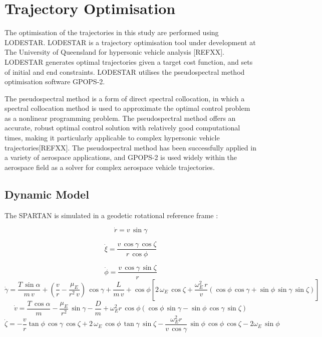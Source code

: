 \documentclass[conf]{new-aiaa}
\begin{document}
\section{Trajectory Optimisation}\label{sec:opt}
The optimisation of the trajectories in this study are performed using LODESTAR. LODESTAR is a trajectory optimisation tool under development at The University of Queensland for hypersonic vehicle analysis [REFXX]. LODESTAR generates optimal trajectories given a target cost function, and sets of initial and end constraints. LODESTAR utilises the pseudospectral method optimisation software GPOPS-2\cite{Patterson2015}. 

The pseudospectral method is a form of direct spectral collocation, in which a spectral collocation method is used to approximate the optimal control problem as a nonlinear programming problem. The pseudospectral method offers an accurate, robust optimal control solution with relatively good computational times, making it particularly applicable to complex hypersonic vehicle trajectories[REFXX].  The pseudospectral method has been successfully applied in a variety of aerospace applications, and GPOPS-2 is used widely within the aerospace field as a solver for complex aerospace vehicle trajectories.


\subsection{Dynamic Model}

The SPARTAN is simulated in a geodetic rotational reference frame \cite{Josselyn2002a}: 

\begin{equation}
\dot{r} = v \, \sin \gamma
\end{equation}

\begin{equation}
\dot{\xi} = \frac{v \, \cos \gamma \, \cos \zeta}{r \, \cos \phi}
\end{equation}

\begin{equation}
\dot{\phi} = \frac{v\,\cos\gamma\,\sin\zeta}{r}
\end{equation}
\begin{equation}
\dot{\gamma} = \frac{T\,\sin\alpha}{m\,v}+ (\frac{v}{r}-\frac{\mu_E}{r^2 \,v})\,\cos\gamma + \frac{L}{m\,v}
+ \cos\phi[2\,\omega_E\, \cos\zeta + \frac{\omega_E^2\, r}{v}(\cos\phi\,\cos\gamma+\sin\phi\,\sin\gamma\,\sin\zeta)]
\end{equation}
\begin{equation}
\dot{v} = \frac{T\,\cos\alpha}{m}-\frac{\mu_E}{r^2}\,\sin\gamma - \frac{D}{m}
+ \omega_E^2 r\,\cos\phi(\cos\phi\,\sin\gamma-\sin\phi\,\cos\gamma\,\sin\zeta)
\end{equation}
\begin{equation}
\dot{\zeta} = -\frac{v}{r}\tan\phi\,\cos\gamma\,\cos\zeta +2\,\omega_E\,\cos\phi\,\tan\gamma\,\sin\zeta - \frac{\omega_E^2 r}{v\,\cos\gamma}\,\sin\phi \, \cos\phi\,\cos\zeta-2\omega_E\,\sin\phi 
\end{equation}
\end{document}
